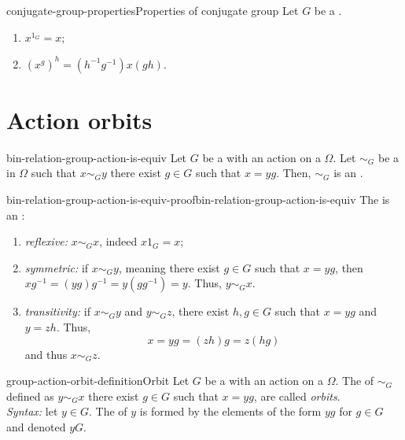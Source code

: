 \documentclass[preview]{standalone}
\begin{document}
\begin{snippetproposition}{conjugate-group-properties}{Properties of conjugate group}
    Let \(G\) be a \group.
    \begin{enumerate}
        \item \(x^{1_G} = x\);
        \item \({(x^g)}^h = (h^{-1}g^{-1})x(gh)\).
    \end{enumerate}
\end{snippetproposition}

\section{Action orbits}

\begin{snippetproposition}{bin-relation-group-action-is-equiv}{}
    Let \(G\) be a \group with an action on a \set \(\Omega\).
    Let \(\sim_G\) be a \binrelation in \(\Omega\) such that
    \(x \sim_G y\) \ifandonlyif there exist \(g\in G\)
    such that \(x=yg\). Then, \(\sim_G\) is an \equivrelation.
\end{snippetproposition}

\begin{snippetproof}{bin-relation-group-action-is-equiv-proof}{bin-relation-group-action-is-equiv}{}
    The \binrelation is an \equivrelation:
    \begin{enumerate}
        \item \emph{reflexive:} \(x \sim_G x\), indeed \(x1_G = x\);
        \item \emph{symmetric:} if \(x \sim_G y\), meaning there exist \(g\in G\)
        such that \(x=yg\), then \(xg^{-1} = (yg)g^{-1} = y(gg^{-1}) = y\).
        Thus, \(y \sim_G x\).
        \item \emph{transitivity:} if \(x \sim_G y\) and \(y\sim_G z\),
        there exist \(h,g \in G\) such that \(x=yg\) and \(y=zh\).
        Thus,
        \[
            x = yg = (zh)g = z(hg)
        \]
        and thus \(x \sim_G z\).
    \end{enumerate}
\end{snippetproof}

\begin{snippetdefinition}{group-action-orbit-definition}{Orbit}
    Let \(G\) be a \group with an action on a \set \(\Omega\).
    The  of \(\sim_G\) defined
    as \(y \sim_G x\) \ifandonlyif there exist \(g\in G\)
    such that \(x=yg\), are called \emph{orbits}. \\
    \emph{Syntax:} let \(y\in G\). The \equivclass of \(y\)
    is formed by the elements of the form \(yg\) for \(g\in G\)
    and denoted \(yG\).
\end{snippetdefinition}
\end{document}
